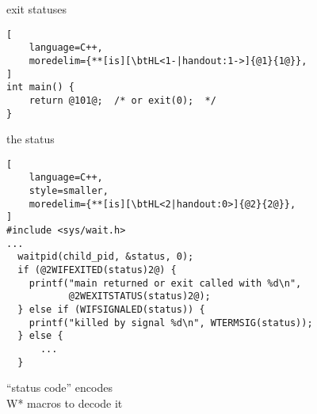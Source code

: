 
\begin{frame}[fragile,label=exitStatuses]{exit statuses}
\begin{lstlisting}[
    language=C++,
    moredelim={**[is][\btHL<1-|handout:1->]{@1}{1@}},
]
int main() {
    return @101@;  /* or exit(0);  */
}
\end{lstlisting}
\end{frame}

\begin{frame}[fragile,label=extractStatus]{the status}
\begin{lstlisting}[
    language=C++,
    style=smaller,
    moredelim={**[is][\btHL<2|handout:0>]{@2}{2@}},
]
#include <sys/wait.h>
...
  waitpid(child_pid, &status, 0);
  if (@2WIFEXITED(status)2@) {
    printf("main returned or exit called with %d\n",
           @2WEXITSTATUS(status)2@);
  } else if (WIFSIGNALED(status)) {
    printf("killed by signal %d\n", WTERMSIG(status));
  } else {
      ...
  }
\end{lstlisting}
``status code'' encodes  \\
W* macros to decode it
\end{frame}
